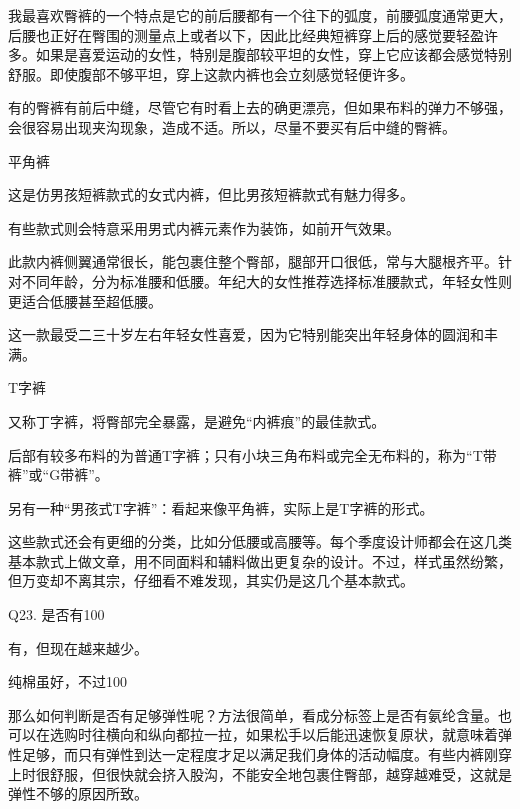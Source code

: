 \documentclass[12pt,UTF8]{ctexbook}
\begin{document}
我最喜欢臀裤的一个特点是它的前后腰都有一个往下的弧度，前腰弧度通常更大，后腰也正好在臀围的测量点上或者以下，因此比经典短裤穿上后的感觉要轻盈许多。如果是喜爱运动的女性，特别是腹部较平坦的女性，穿上它应该都会感觉特别舒服。即使腹部不够平坦，穿上这款内裤也会立刻感觉轻便许多。

有的臀裤有前后中缝，尽管它有时看上去的确更漂亮，但如果布料的弹力不够强，会很容易出现夹沟现象，造成不适。所以，尽量不要买有后中缝的臀裤。

平角裤

这是仿男孩短裤款式的女式内裤，但比男孩短裤款式有魅力得多。



有些款式则会特意采用男式内裤元素作为装饰，如前开气效果。



此款内裤侧翼通常很长，能包裹住整个臀部，腿部开口很低，常与大腿根齐平。针对不同年龄，分为标准腰和低腰。年纪大的女性推荐选择标准腰款式，年轻女性则更适合低腰甚至超低腰。

这一款最受二三十岁左右年轻女性喜爱，因为它特别能突出年轻身体的圆润和丰满。

T字裤



又称丁字裤，将臀部完全暴露，是避免“内裤痕”的最佳款式。

后部有较多布料的为普通T字裤；只有小块三角布料或完全无布料的，称为“T带裤”或“G带裤”。

另有一种“男孩式T字裤”：看起来像平角裤，实际上是T字裤的形式。


这些款式还会有更细的分类，比如分低腰或高腰等。每个季度设计师都会在这几类基本款式上做文章，用不同面料和辅料做出更复杂的设计。不过，样式虽然纷繁，但万变却不离其宗，仔细看不难发现，其实仍是这几个基本款式。





Q23. 是否有100%


有，但现在越来越少。

纯棉虽好，不过100%

那么如何判断是否有足够弹性呢？方法很简单，看成分标签上是否有氨纶含量。也可以在选购时往横向和纵向都拉一拉，如果松手以后能迅速恢复原状，就意味着弹性足够，而只有弹性到达一定程度才足以满足我们身体的活动幅度。有些内裤刚穿上时很舒服，但很快就会挤入股沟，不能安全地包裹住臀部，越穿越难受，这就是弹性不够的原因所致。
\end{document}
